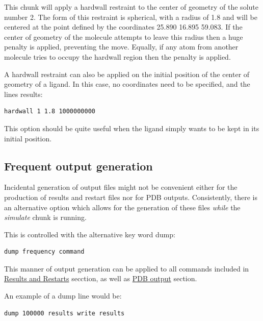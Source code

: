 \documentclass[letterpaper,10pt,english]{sphinxmanual}
\begin{document}
This chunk will apply a hardwall restraint to the center of geometry of the solute number 2. The form of this restraint is spherical, with a radius of 1.8 and will be centered at the point defined by the coordinates 25.890 16.895 59.083. If the center of geometry of the molecule attempts to leave this radius then a huge penalty is applied, preventing the move. Equally, if any atom from another molecule tries to occupy the hardwall region then the penalty is applied.

A hardwall restraint can also be applied on the initial position of the center of geometry of a ligand. In this case, no coordinates need to be specified, and the lines results:

\begin{Verbatim}[frame=single,commandchars=\\\{\}]
hardwall 1 1.8 1000000000
\end{Verbatim}

This option should be quite useful when the ligand simply wants to be kept in its initial position.


\subsection{Frequent output generation}
\label{protoms:frequent-output-generation}
Incidental generation of output files might not be convenient either for the production of results and restart files nor for PDB outputs. Consistently, there is an alternative option which allows for the generation of these files \emph{while} the \emph{simulate} chunk is running.

This is controlled with the alternative key word dump:

\begin{Verbatim}[frame=single,commandchars=\\\{\}]
dump frequency command
\end{Verbatim}

This manner of output generation can be applied to all commands included in {\hyperref[protoms:results-and-restarts]{Results and Restarts}} secction, as well as {\hyperref[protoms:pdb-output]{PDB output}} section.

An example of a dump line would be:

\begin{Verbatim}[frame=single,commandchars=\\\{\}]
dump 100000 results write results
\end{Verbatim}
\end{document}
